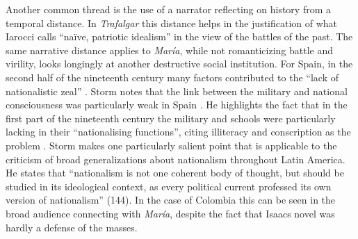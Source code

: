\documentclass[12pt]{report}
\begin{document}
Another common thread is the use of a narrator reflecting on history from a temporal distance.
In \textit{Trafalgar} this distance helps in the justification of what Iarocci calls \enquote{naïve, patriotic idealism} in the view of the battles of the past.
The same narrative distance applies to \textit{María}, while not romanticizing battle and virility, looks longingly at another destructive social institution. 
For Spain, in the second half of the nineteenth century many factors contributed to the \enquote{lack of nationalistic zeal} \cite[143]{Storm2004}.
Storm notes that the link between the military and national consciousness was particularly weak in Spain \cite[144]{Storm2004}.
He highlights the fact that in the first part of the nineteenth century the military and schools were particularly lacking in their \enquote{nationalising functions}, citing illiteracy and conscription as the problem \cite[144]{Storm2004}.
Storm makes one particularly salient point that is applicable to the criticism of broad generalizations about nationalism throughout Latin America.
He states that \enquote{nationalism is not one coherent body of thought, but should be studied in its ideological context, as every political current professed its own version of nationalism} (144)\nocite{Storm2004}. 
In the case of Colombia this can be seen in the broad audience connecting with \textit{María}, despite the fact that Isaacs novel was hardly a defense of the masses.
\end{document}
